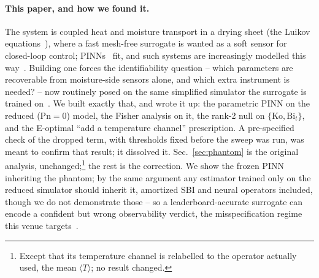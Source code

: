 \documentclass{article}
\begin{document}
\paragraph{This paper, and how we found it.} The system is coupled heat and moisture transport in a
drying sheet (the Luikov equations~\cite{luikov1975}), where a fast mesh-free surrogate is wanted as a
soft sensor for closed-loop control; PINNs~\cite{raissi2019} fit, and such systems are increasingly
modelled this way~\cite{manavi2024,laubscher2021}. Building one forces the identifiability question --
which parameters are recoverable from moisture-side sensors alone, and which extra instrument is
needed? -- now routinely posed on the same simplified simulator the surrogate is trained
on~\cite{cranmer2020sbi}. We built exactly that, and wrote it up: the parametric PINN on the reduced
($\mathrm{Pn}{=}0$) model, the Fisher analysis on it, the rank-2 null on
$\{\mathrm{Ko},\mathrm{Bi}_t\}$, and the E-optimal ``add a temperature channel'' prescription. A
pre-specified check of the dropped term, with thresholds fixed before the sweep was run, was meant to
confirm that result; it dissolved it. Sec.~\ref{sec:phantom} is the original analysis, unchanged;\footnote{Except that its temperature
channel is relabelled to the operator actually used, the mean $\langle T\rangle$; no result changed.} the
rest is the correction. We show the frozen PINN inheriting the phantom; by the same argument any
estimator trained only on the reduced simulator should inherit it, amortized SBI and neural operators
included, though we do not demonstrate those -- so a leaderboard-accurate surrogate can encode a
confident but wrong observability verdict, the misspecification regime this venue
targets~\cite{cranmer2020sbi}.
\end{document}
